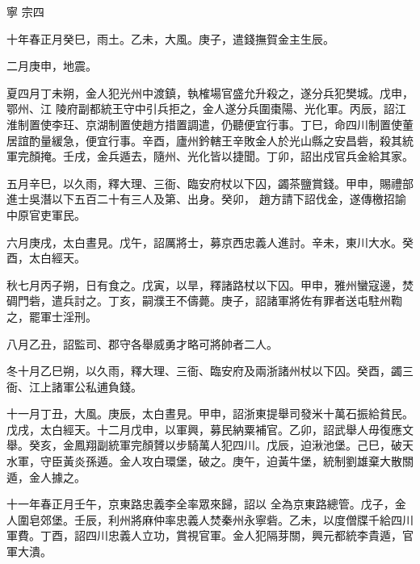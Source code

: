 
\begin{pinyinscope}

 寧
 宗四



 十年春正月癸巳，雨土。乙未，大風。庚子，遣錢撫賀金主生辰。



 二月庚申，地震。



 夏四月丁未朔，金人犯光州中渡鎮，執榷場官盛允升殺之，遂分兵犯樊城。戊申，鄂州、江
 陵府副都統王守中引兵拒之，金人遂分兵圍棗陽、光化軍。丙辰，詔江淮制置使李玨、京湖制置使趙方措置調遣，仍聽便宜行事。丁巳，命四川制置使董居誼酌量緩急，便宜行事。辛酉，廬州鈐轄王辛敗金人於光山縣之安昌砦，殺其統軍完顏掩。壬戌，金兵遁去，隨州、光化皆以捷聞。丁卯，詔出戍官兵金給其家。



 五月辛巳，以久雨，釋大理、三衙、臨安府杖以下囚，蠲茶鹽賞錢。甲申，賜禮部進士吳潛以下五百二十有三人及第、出身。癸卯，
 趙方請下詔伐金，遂傳檄招諭中原官吏軍民。



 六月庚戌，太白晝見。戊午，詔厲將士，募京西忠義人進討。辛未，東川大水。癸酉，太白經天。



 秋七月丙子朔，日有食之。戊寅，以旱，釋諸路杖以下囚。甲申，雅州蠻寇邊，焚碉門砦，遣兵討之。丁亥，嗣濮王不儔薨。庚子，詔諸軍將佐有罪者送屯駐州鞫之，罷軍士淫刑。



 八月乙丑，詔監司、郡守各舉威勇才略可將帥者二人。



 冬十月乙巳朔，以久雨，釋大理、三衙、臨安府及兩浙諸州杖以下囚。癸酉，蠲三
 衙、江上諸軍公私逋負錢。



 十一月丁丑，大風。庚辰，太白晝見。甲申，詔浙東提舉司發米十萬石振給貧民。戊戌，太白經天。十二月戊申，以軍興，募民納粟補官。乙卯，詔武舉人毋復應文舉。癸亥，金鳳翔副統軍完顏贇以步騎萬人犯四川。戊辰，迫湫池堡。己巳，破天水軍，守臣黃炎孫遁。金人攻白環堡，破之。庚午，迫黃牛堡，統制劉雄棄大散關遁，金人據之。



 十一年春正月壬午，京東路忠義李全率眾來歸，詔以
 全為京東路總管。戊子，金人圍皂郊堡。壬辰，利州將麻仲率忠義人焚秦州永寧砦。乙未，以度僧牒千給四川軍費。丁酉，詔四川忠義人立功，賞視官軍。金人犯隔芽關，興元都統李貴遁，官軍大潰。




\end{pinyinscope}
